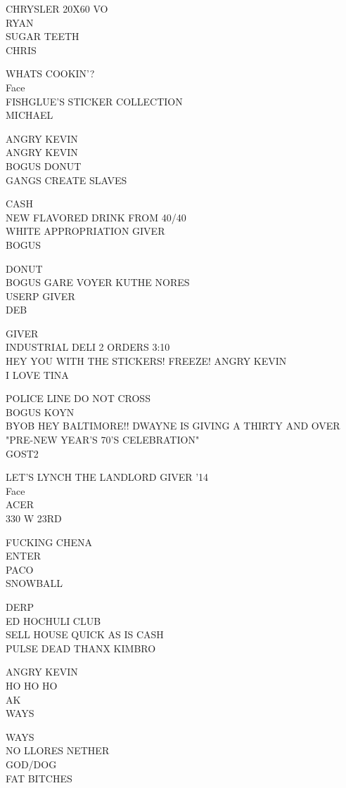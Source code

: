 \documentclass[10pt,letterpaper]{article}
\begin{document}
CHRYSLER 20X60 VO\\
RYAN\\
SUGAR TEETH\\
CHRIS

WHATS COOKIN'?\\
Face\\
FISHGLUE'S STICKER COLLECTION\\
MICHAEL

ANGRY KEVIN\\
ANGRY KEVIN\\
BOGUS DONUT\\
GANGS CREATE SLAVES

CASH\\
NEW FLAVORED DRINK FROM 40/40\\
WHITE APPROPRIATION GIVER\\
BOGUS

DONUT\\
BOGUS GARE VOYER KUTHE NORES\\
USERP GIVER\\
DEB

GIVER\\
INDUSTRIAL DELI 2 ORDERS 3:10\\
HEY YOU WITH THE STICKERS!  FREEZE!  ANGRY KEVIN\\
I LOVE TINA

POLICE LINE DO NOT CROSS\\
BOGUS KOYN\\
BYOB HEY BALTIMORE!! DWAYNE IS GIVING A THIRTY AND OVER "PRE{-}NEW YEAR'S 70'S CELEBRATION"\\
GOST2

LET'S LYNCH THE LANDLORD GIVER '14\\
Face\\
ACER\\
330 W 23RD

FUCKING CHENA\\
ENTER\\
PACO\\
SNOWBALL

DERP\\
ED HOCHULI CLUB\\
SELL HOUSE QUICK AS IS CASH\\
PULSE DEAD THANX KIMBRO

ANGRY KEVIN\\
HO HO HO\\
AK\\
WAYS

WAYS\\
NO LLORES NETHER\\
GOD/DOG\\
FAT BITCHES
\end{document}
